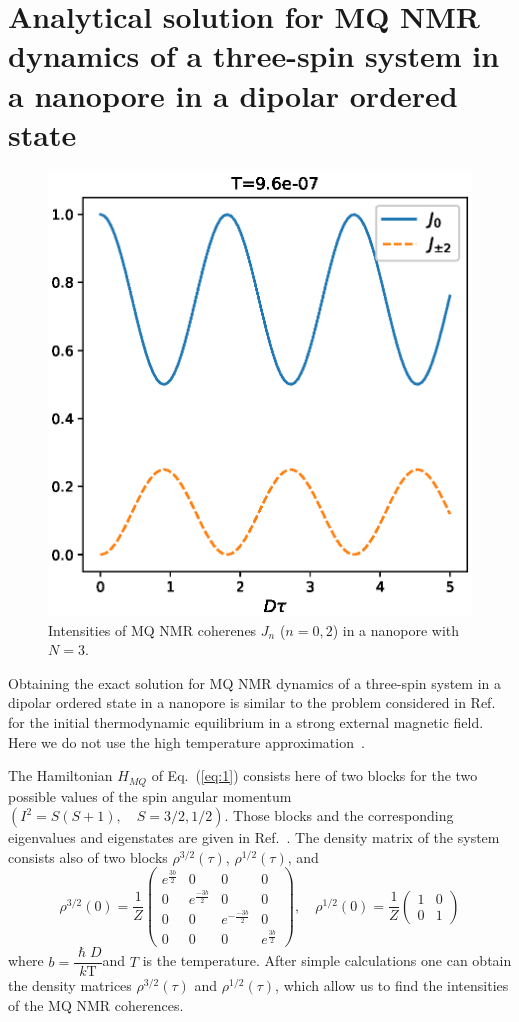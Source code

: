\section{Analytical solution for MQ NMR dynamics of a three-spin system in a nanopore in a dipolar ordered state}
\label{sec:3}

\begin{figure}
    \centering
  	\includegraphics[width=0.5\linewidth]{coherences_n3_beta5.eps}
	\caption{
	    Intensities of MQ NMR coherenes $J_{n}$ ($n=0, 2$) in a nanopore with $N=3$.
	}
	\label{fig:1}
\end{figure}

Obtaining the exact solution for MQ NMR dynamics of a three-spin system in a dipolar ordered state in a nanopore is similar to the problem considered in Ref.~\cite{Doronin_2019} for the initial thermodynamic equilibrium in a strong external magnetic field.
Here we do not use the high temperature approximation~\cite{Goldman_1970}.

The Hamiltonian $H_{MQ}$ of Eq.~(\ref{eq:1}) consists here of two blocks for the two possible values of the spin angular momentum $(I^2 = S(S+1),  \quad S=3/2,1/2)$.
Those blocks and the corresponding eigenvalues and eigenstates are given in Ref.~\cite{Doronin_2019}.
The density matrix of the system consists also of two blocks $\rho^{3/2}(\tau)$, $\rho^{1/2}(\tau)$, and
%
\begin{equation}
    \label{eq:15}
    \rho^{3/2}(0) = \dfrac 1 Z
    \begin{pmatrix}
        e^{\frac{3b}{2}} & 0 & 0 & 0
        \\
        0 & e^{\frac{-3b}{2}} & 0 & 0
        \\
        0 & 0 & e^{-\frac{-3b}{2}} & 0
        \\
        0 & 0 & 0 & e^{\frac{3b}{2}}
    \end{pmatrix},
    \quad
    \rho^{1/2}(0) = \dfrac 1 Z
    \begin{pmatrix}
       	1 & 0
        \\
        0 & 1
    \end{pmatrix}
\end{equation}
%
where $b = \dfrac{\hslash D}{k\mathrm{T}}$and $T$ is the temperature.
After simple calculations one can obtain the density matrices $\rho^{3/2}(\tau)$ and $\rho^{1/2}(\tau)$,
which allow us to find the intensities of the MQ NMR coherences.

